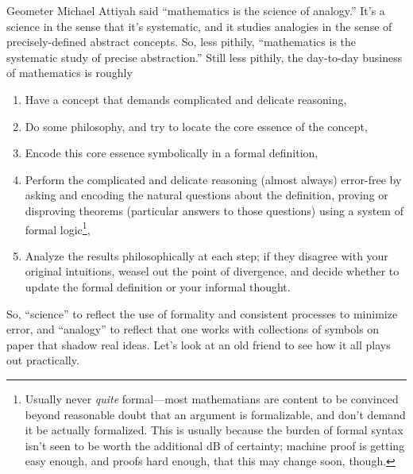 Geometer Michael Attiyah said ``mathematics is the science of analogy.''
It's a science in the sense that it's systematic, and it studies analogies in the sense of precisely-defined abstract concepts.
So, less pithily, ``mathematics is the systematic study of precise abstraction.''
Still less pithily, the day-to-day business of mathematics is roughly
\begin{enumerate}
\item Have a concept that demands complicated and delicate reasoning,
\item Do some philosophy, and try to locate the core essence of the concept,
\item Encode this core essence symbolically in a formal definition,
\item Perform the complicated and delicate reasoning (almost always) error-free by asking and encoding the natural questions about the definition,
  proving or disproving theorems (particular answers to those questions) using a system of formal logic\footnote
  {
    Usually never \textit{quite} formal---most mathematians are content to be convinced beyond reasonable doubt that an argument is formalizable,
    and don't demand it be actually formalized.
    This is usually because the burden of formal syntax isn't seen to be worth the additional \si{dB} of certainty;
    machine proof is getting easy enough, and proofs hard enough, that this may change soon, though.
  },
\item Analyze the results philosophically at each step; if they disagree with your original intuitions, weasel out the point of divergence,
  and decide whether to update the formal definition or your informal thought.
\end{enumerate}
So, ``science'' to reflect the use of formality and consistent processes to minimize error, and ``analogy'' to reflect that one works with
collections of symbols on paper that shadow real ideas.
Let's look at an old friend to see how it all plays out practically.

